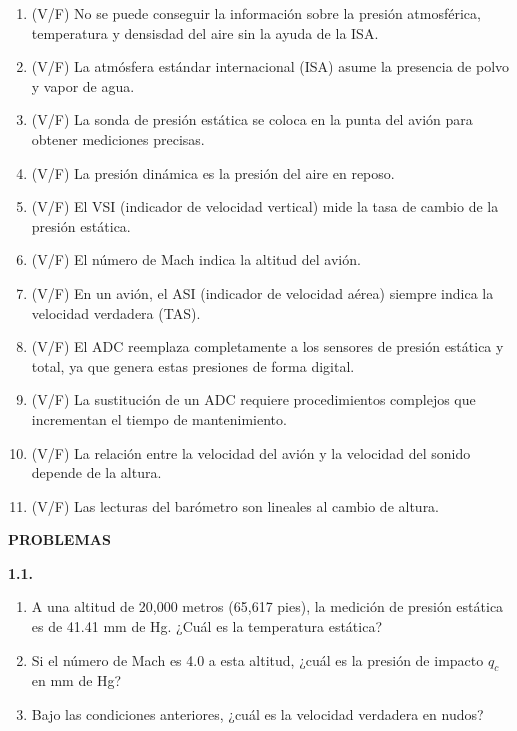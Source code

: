 \begin{enumerate}
\item (V/F) No se puede conseguir la información sobre la presión atmosférica, temperatura y densisdad del aire sin la ayuda de la ISA. 

\item (V/F) La atmósfera estándar internacional (ISA) asume la presencia de polvo y vapor de agua.

\item (V/F) La sonda de presión estática se coloca en la punta del avión para obtener mediciones precisas.

\item (V/F) La presión dinámica es la presión del aire en reposo.

\item (V/F) El VSI (indicador de velocidad vertical) mide la tasa de cambio de la presión estática.

\item (V/F) El número de Mach indica la altitud del avión.

\item (V/F) En un avión, el ASI (indicador de velocidad aérea) siempre indica la velocidad verdadera (TAS).

\item (V/F) El ADC reemplaza completamente a los sensores de presión estática y total, ya que genera estas presiones de forma digital.

\item (V/F) La sustitución de un ADC requiere procedimientos complejos que incrementan el tiempo de mantenimiento.

\item (V/F) La relación entre la velocidad del avión y la velocidad del sonido depende de la altura.

\item (V/F) Las lecturas del barómetro son lineales al cambio de altura.\\
\end{enumerate}


\begin{nosangria}
\Large{\textbf{PROBLEMAS}}
\end{nosangria}

\textbf{1.1.}  
\begin{enumerate}[label=(\alph*)]
    \item A una altitud de 20,000 metros (65,617 pies), la medición de presión estática es de 41.41 mm de Hg. ¿Cuál es la temperatura estática?
    \item Si el número de Mach es 4.0 a esta altitud, ¿cuál es la presión de impacto \( q_c \) en mm de Hg?
    \item Bajo las condiciones anteriores, ¿cuál es la velocidad verdadera en nudos?
\end{enumerate}

